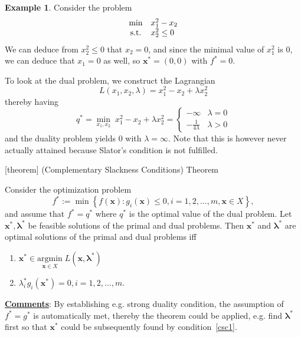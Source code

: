 \documentclass[12pt]{report}
\theoremstyle{definition}
\begin{document}
\newtheorem{strong duality example}[theorem]{Example}
\begin{strong duality example}
    Consider the problem
    \begin{equation*}
        \begin{array}{c @{\quad} l}
            \min & x_1^2-x_2 \\
            \text{s.t.} & x_2^2\le 0
        \end{array} 
    \end{equation*}
    We can deduce from $x_2^2\le 0$ that $x_2=0$, and since the minimal value of
    $x_1^2$ is 0, we can deduce that $x_1=0$ as well, so $\mathbf{x}^*=(0,0)$
    with $f^*=0$.

    \medskip\noindent
    To look at the dual problem, we construct the Lagrangian
    \[
        L(x_1,x_2,\lambda)=x_1^2-x_2+\lambda x_2^2
    \]
    thereby having
    \[
        q^*=\underset{x_1,x_2}{\min}\;x_1^2-x_2+\lambda x_2^2=
        \begin{cases}
            -\infty & \lambda=0 \\
            -\frac{1}{4\lambda} & \lambda>0
        \end{cases}
    \]
    and the duality problem yields $0$ with $\lambda=\infty$.
    Note that this is however never actually attained because Slator's condition
    is not fulfilled.
\end{strong duality example}

[theorem]
{(Complementary Slackness Conditions) Theorem}
\begin{complementary slackness condition}
    Consider the optimization problem
    \[
        f^*:=\min \left\{f(\mathbf{x}):g_i(\mathbf{x})\le
        0,i=1,2,\ldots,m,\mathbf{x}\in X\right\},
    \]
    and assume that $f^*=q^*$ where $q^*$ is the optimal value of the dual
    problem. Let $\mathbf{x}^*,\pmb{\lambda}^*$ be feasible solutions of the
    primal and dual problems. Then $\mathbf{x}^*$ and $\pmb{\lambda}^*$ are
    optimal solutions of the primal and dual problems iff
    \begin{enumerate}
        \item \label{csc1}
            $\mathbf{x}^*\in \underset{\mathbf{x}\in
            X}{\text{argmin}}\;L(\mathbf{x},\pmb{\lambda}^*)$
        \item $\lambda_i^*g_i(\mathbf{x}^*)=0,i=1,2,\ldots,m$.
    \end{enumerate}
\end{complementary slackness condition}
\underline{\textbf{Comments}}: By establishing e.g. strong duality condition,
the assumption of $f^*=g^*$ is automatically met, thereby the theorem could be
applied, e.g. find $\pmb{\lambda}^*$ first so that $\mathbf{x}^*$ could be
subsequently found by condition~\ref{csc1}.
\end{document}
